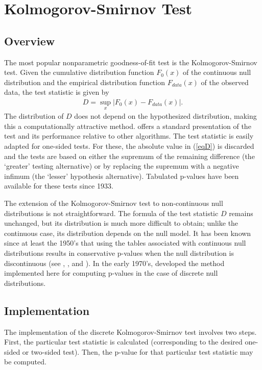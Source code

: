\section{Kolmogorov-Smirnov Test}


\subsection{Overview}

The most popular nonparametric goodness-of-fit test is the
Kolmogorov-Smirnov test.
Given the cumulative distribution
function $F_0(x)$ of the continuous null distribution
and the empirical distribution function $F_{data}(x)$ of the observed data,  the test statistic is given by
\begin{align}
D = \sup_x \left| F_0(x)- F_{data}(x) \right|.    \label{eqD}
\end{align}
The distribution of $D$ does not depend on the hypothesized
distribution, making this a computationally
attractive method. \cite{slakter65} offers a standard presentation
of the test and its
performance relative to other algorithms. 
The test statistic is easily adapted for one-sided tests.
For these, the absolute value in (\ref{eqD}) is discarded and the tests are based
on either the supremum of the remaining difference (the `greater' testing
alternative) or by replacing the supremum with a negative infimum
(the `lesser' hypothesis alternative).  Tabulated p-values have been
available for these tests since 1933. 

The extension of the Kolmogorov-Smirnov test to non-continuous 
null distributions is not straightforward. The formula of
the test statistic $D$ remains unchanged, but its distribution
is much more difficult to obtain; unlike the 
continuous case, its distribution depends on the null model.
It has been known since at least the 1950's that using the tables associated
with continuous null distributions results in conservative p-values
when the null distribution is discontinuous 
(see \cite{slakter1965}, \cite{goodman1954}, and \cite{massey1951}).  
In the early 1970's, 
\citet{Conover1972} developed the method implemented here
for computing p-values
in the case of discrete null distributions.

\subsection{Implementation}

The implementation of the discrete Kolmogorov-Smirnov test involves
two steps. First, the particular test statistic is calculated
(corresponding to the desired one-sided or two-sided test).
Then, the p-value for that particular test statistic may be computed. 

